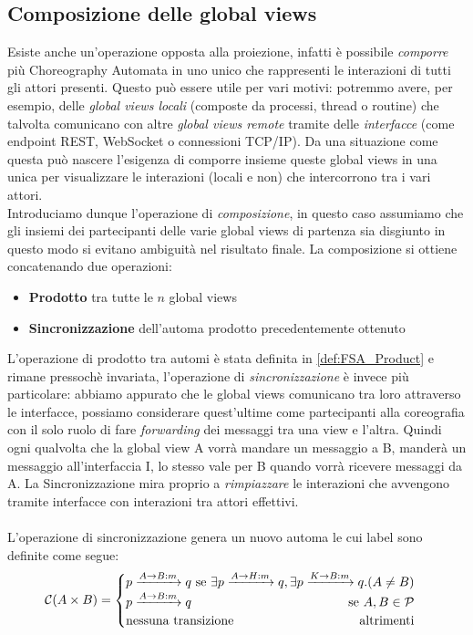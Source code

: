 \subsection{Composizione delle global views}
Esiste anche un'operazione opposta alla proiezione, infatti è possibile \emph{comporre}\cite{CA_Composition} più Choreography Automata in uno unico che rappresenti le interazioni di tutti gli attori presenti. Questo può essere utile per vari motivi: potremmo avere, per esempio, delle \emph{global views locali} (composte da processi, thread o routine) che talvolta comunicano con altre \emph{global views remote} tramite delle \emph{interfacce} (come endpoint REST, WebSocket o connessioni TCP/IP). Da una situazione come questa può nascere l'esigenza di comporre insieme queste global views in una unica per visualizzare le interazioni (locali e non) che intercorrono tra i vari attori.\\
Introduciamo dunque l'operazione di \emph{composizione}, in questo caso assumiamo che gli insiemi dei partecipanti delle varie global views di partenza sia disgiunto in questo modo si evitano ambiguità nel risultato finale. La composizione si ottiene concatenando due operazioni:
\begin{itemize}
    \item \textbf{Prodotto} tra tutte le $n$ global views
    \item \textbf{Sincronizzazione} dell'automa prodotto precedentemente ottenuto
\end{itemize}
L'operazione di prodotto tra automi è stata definita in \ref{def:FSA_Product} e rimane pressochè invariata, l'operazione di \emph{sincronizzazione} è invece più particolare: abbiamo appurato che le global views comunicano tra loro attraverso le interfacce, possiamo considerare quest'ultime come partecipanti alla coreografia con il solo ruolo di fare \emph{forwarding} dei messaggi tra una view e l'altra. Quindi ogni qualvolta che la global view A vorrà mandare un messaggio a B, manderà un messaggio all'interfaccia I, lo stesso vale per B quando vorrà ricevere messaggi da A. La Sincronizzazione mira proprio a \emph{rimpiazzare} le interazioni che avvengono tramite interfacce con interazioni tra attori effettivi.\\\\
L'operazione di sincronizzazione genera un nuovo automa le cui label sono definite come segue:
\begin{equation*}
    \mathcal{C}(A \times B) =
    \begin{cases}
        p \xrightarrow{A \rightarrow B: m} q \hfill \text{ se } \exists p \xrightarrow{A \rightarrow H: m} q, \exists  p \xrightarrow{K \rightarrow B: m} q. (A \neq B) \\
        p \xrightarrow{A \rightarrow B: m} q \hfill \text{ se } A, B\in \mathcal{P}                                                                                     \\
        \text{nessuna transizione} \hfill \text{altrimenti}
    \end{cases}
\end{equation*}
